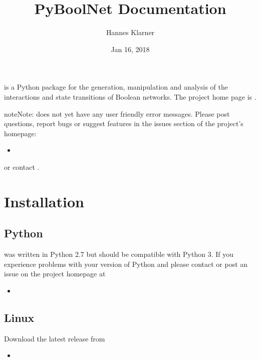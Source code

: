 \documentclass[letterpaper,10pt,english]{sphinxmanual}
\title{PyBoolNet Documentation}
\date{Jan 16, 2018}
\author{Hannes Klarner}
\begin{document}
\maketitle
\sphinxtableofcontents
{}\label{\detokenize{index::doc}}
 is a Python package for the generation, manipulation and analysis of the interactions and state transitions of Boolean networks.
The project home page is .

\begin{sphinxadmonition}{note}{Note:}
 does not yet have any user friendly error messages.
Please post questions, report bugs or suggest features in the issues section of the project’s homepage:
\begin{itemize}
\item {} 

\end{itemize}

or contact .
\end{sphinxadmonition}




\chapter{Installation}
\label{\detokenize{Installation:installation}}\label{\detokenize{Installation:id1}}\label{\detokenize{Installation::doc}}\label{\detokenize{Installation:installation-software}}

\section{Python}
\label{\detokenize{Installation:python}}
 was written in Python 2.7 but should be compatible with Python 3.
If you experience problems with your version of Python and  please contact  or
post an issue on the project homepage at
\begin{itemize}
\item {} 

\end{itemize}


\section{Linux}
\label{\detokenize{Installation:linux}}
Download the latest release from
\begin{itemize}
\item {} 

\end{itemize}
\end{document}

